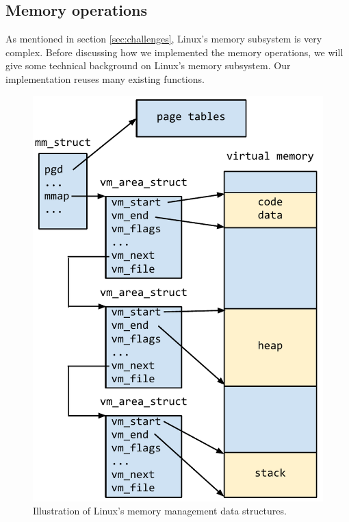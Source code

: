 \begin{itemize}
\subsection{Memory operations}

\label{sec:memop}

As mentioned in section \ref{sec:challenges}, Linux's memory subsystem is
very complex. Before discussing how we implemented the memory operations,
we will give some technical background on Linux's memory subsystem. Our
implementation reuses many existing functions.

\begin{figure}[t]
\includegraphics[scale=.63]{mm_struct.pdf}
\caption{Illustration of Linux's memory management data structures.}
\label{fig:mmstruct}
\end{figure}


\end{itemize}
